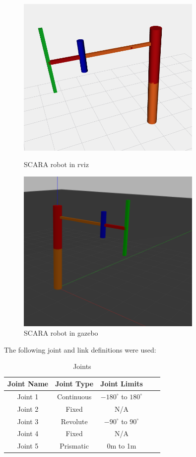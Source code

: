 \documentclass[10pt]{article}
\begin{document}
\begin{enumerate}
	\begin{figure}[h]
	\begin{minipage}[h]{0.5\textwidth}
		\centering
		\includegraphics[width=0.8\textwidth]{figures/rviz_robot.png}
		\caption{SCARA robot in rviz}
	\end{minipage}
	\begin{minipage}[h]{0.5\textwidth}
		\centering
		\includegraphics[width=0.8\textwidth]{figures/gazebo_robot.png}
		\caption{SCARA robot in gazebo}
	\end{minipage}
	\end{figure}
	
	The following joint and link definitions were used:
	\begin{table}[h]
		\centering
		\begin{tabular}{|c|c|c|c|c|}
			\hline
			Joint Name & Joint Type & Joint Limits \\\hline
			Joint 1 & Continuous & $-180^\circ$ to $180^\circ$ \\
			Joint 2 & Fixed & N/A \\
			Joint 3 & Revolute & $-90^\circ$ to $90^\circ$ \\
			Joint 4 & Fixed & N/A \\
			Joint 5 & Prismatic & 0m to 1m \\\hline
		\end{tabular}
		\caption{\label{tab:widgets}Joints}
	\end{table}
	

\end{enumerate}
\end{document}
